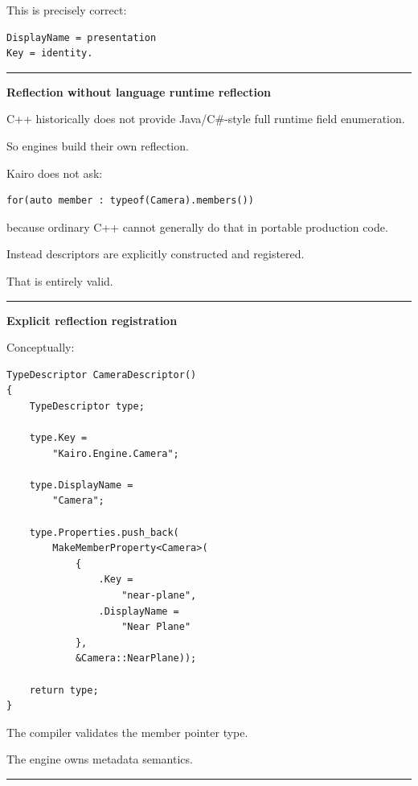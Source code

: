 This is precisely correct:

\begin{verbatim}
DisplayName = presentation
Key = identity.
\end{verbatim}

\begin{center}\rule{0.5\linewidth}{0.5pt}\end{center}

\textbf{Reflection without language runtime reflection}

C++ historically does not provide Java/C\#-style full runtime field enumeration.

So engines build their own reflection.

Kairo does not ask:

\begin{verbatim}
for(auto member : typeof(Camera).members())
\end{verbatim}

because ordinary C++ cannot generally do that in portable production code.

Instead descriptors are explicitly constructed and registered.

That is entirely valid.

\begin{center}\rule{0.5\linewidth}{0.5pt}\end{center}

\textbf{Explicit reflection registration}

Conceptually:

\begin{verbatim}
TypeDescriptor CameraDescriptor()
{
    TypeDescriptor type;

    type.Key =
        "Kairo.Engine.Camera";

    type.DisplayName =
        "Camera";

    type.Properties.push_back(
        MakeMemberProperty<Camera>(
            {
                .Key =
                    "near-plane",
                .DisplayName =
                    "Near Plane"
            },
            &Camera::NearPlane));

    return type;
}
\end{verbatim}

The compiler validates the member pointer type.

The engine owns metadata semantics.

\begin{center}\rule{0.5\linewidth}{0.5pt}\end{center}

